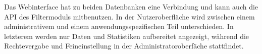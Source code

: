 Das Webinterface hat zu beiden Datenbanken eine Verbindung und kann auch die API des Filtermoduls mitbenutzen. In der Nutzeroberfläche wird zwischen einem administrativem und einem anwendungsspezifischen Teil unterschieden. In letzterem werden nur Daten und Statistiken aufbereitet angezeigt, während die Rechtevergabe und Feineinstellung in der Administratoroberfäche stattfindet. 